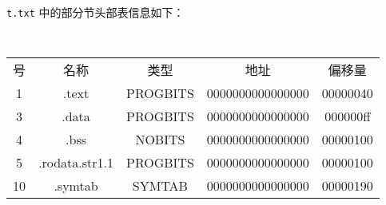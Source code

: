 \begin{problems}
        \verb|t.txt| 中的部分节头部表信息如下：
        \begin{table}[H]
            \tt
            \centering
            \begin{tabular}{|ccccc|}
                \hline
                号 & 名称 & 类型 & 地址 & 偏移量 \\
                1 & .text & PROGBITS & 0000000000000000 & 00000040 \\
                3 & .data & PROGBITS & 0000000000000000 & 000000ff \\
                4 & .bss & NOBITS & 0000000000000000 & 00000100 \\
                5 & .rodata.str1.1 & PROGBITS & 0000000000000000 & 00000100 \\
                10 & .symtab & SYMTAB & 0000000000000000 & 00000190 \\ \hline
            \end{tabular}
        \end{table}


\end{problems}
